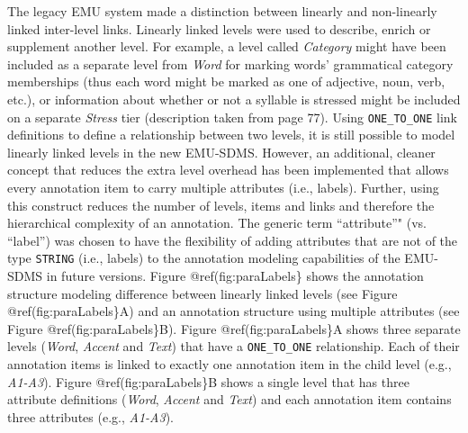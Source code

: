\documentclass[]{book}
\theoremstyle{definition}
\theoremstyle{definition}
\theoremstyle{definition}
\theoremstyle{remark}
\begin{document}
The legacy EMU system made a distinction between linearly and
non-linearly linked inter-level links. Linearly linked levels were used
to describe, enrich or supplement another level. For example, a level
called \emph{Category} might have been included as a separate level from
\emph{Word} for marking words' grammatical category memberships (thus
each word might be marked as one of adjective, noun, verb, etc.), or
information about whether or not a syllable is stressed might be
included on a separate \emph{Stress} tier (description taken from
\citet{harrington:2010a} page 77). Using \texttt{ONE\_TO\_ONE} link
definitions to define a relationship between two levels, it is still
possible to model linearly linked levels in the new EMU-SDMS. However,
an additional, cleaner concept that reduces the extra level overhead has
been implemented that allows every annotation item to carry multiple
attributes (i.e., labels). Further, using this construct reduces the
number of levels, items and links and therefore the hierarchical
complexity of an annotation. The generic term ``attribute''" (vs.
``label'') was chosen to have the flexibility of adding attributes that
are not of the type \texttt{STRING} (i.e., labels) to the annotation
modeling capabilities of the EMU-SDMS in future versions. Figure
@ref(fig:paraLabels\} shows the annotation structure modeling difference
between linearly linked levels (see Figure @ref(fig:paraLabels\}A) and
an annotation structure using multiple attributes (see Figure
@ref(fig:paraLabels\}B). Figure @ref(fig:paraLabels\}A shows three
separate levels (\emph{Word}, \emph{Accent} and \emph{Text}) that have a
\texttt{ONE\_TO\_ONE} relationship. Each of their annotation items is
linked to exactly one annotation item in the child level (e.g.,
\emph{A1-A3}). Figure @ref(fig:paraLabels\}B shows a single level that
has three attribute definitions (\emph{Word}, \emph{Accent} and
\emph{Text}) and each annotation item contains three attributes (e.g.,
\emph{A1-A3}).
\end{document}
